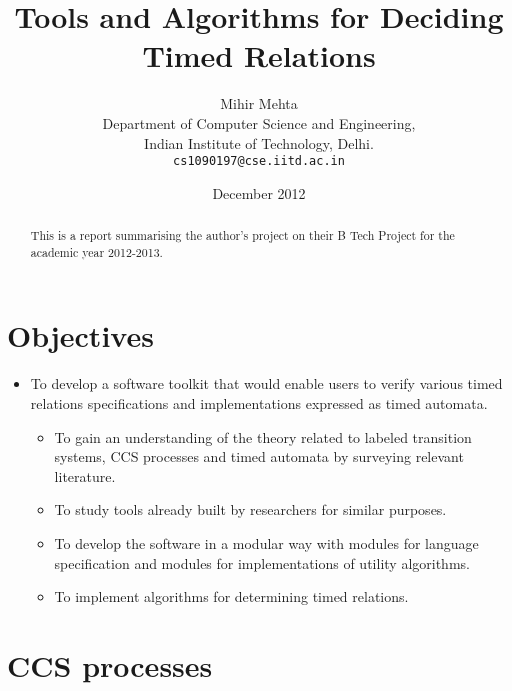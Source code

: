 \documentclass{article}
\begin{document}
\title{Tools and Algorithms for Deciding Timed Relations}

\author{Mihir Mehta\\
Department of Computer Science and Engineering,\\
Indian Institute of Technology, Delhi.\\
\texttt{cs1090197@cse.iitd.ac.in}
}

\date{December 2012}

\maketitle

\begin{abstract}
This is a report summarising the author's project on their B Tech
Project for the academic year 2012-2013.
\end{abstract}

\section{Objectives}

\begin{itemize}

\item To develop a software toolkit that would enable users to verify
  various timed relations specifications and implementations expressed
  as timed automata.

  \begin{itemize}

  \item To gain an understanding of the theory related to labeled
    transition systems, CCS processes and timed automata by surveying
    relevant literature.

  \item To study tools already built by researchers for similar purposes.

  \item To develop the software in a modular way with modules for
    language specification and modules for implementations of utility
    algorithms.

  \item To implement algorithms for determining timed relations.

  \end{itemize}

\end{itemize}

\section{CCS processes}
\end{document}
